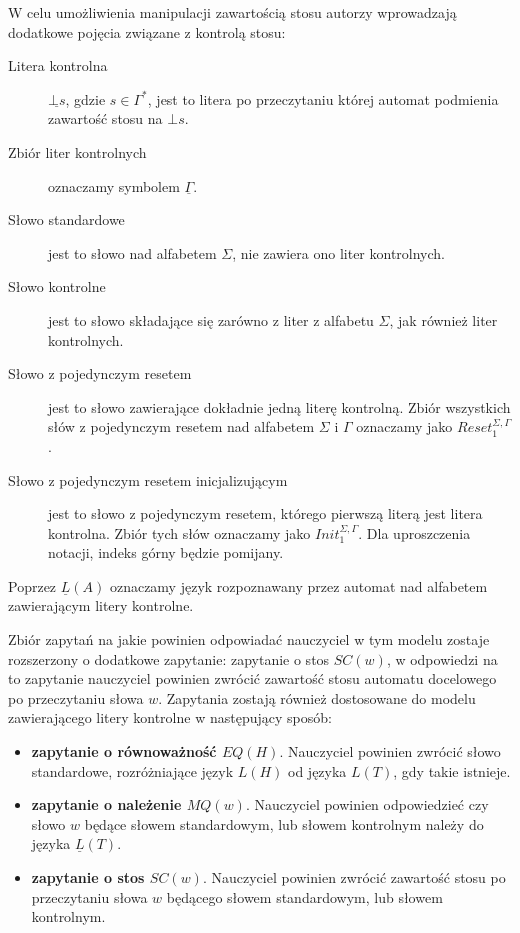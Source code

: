 W celu umożliwienia manipulacji zawartością stosu autorzy wprowadzają dodatkowe pojęcia związane z kontrolą stosu:
\begin{description}
    \item[Litera kontrolna] $\underline{\bot s}$, gdzie $s \in \Gamma^*$, jest to litera po przeczytaniu której automat podmienia
      zawartość stosu na $\bot s$.

    \item[Zbiór liter kontrolnych] oznaczamy symbolem $\underline{\Gamma}$.

    \item[Słowo standardowe] jest to słowo nad alfabetem $\Sigma$, nie zawiera ono liter kontrolnych.

    \item[Słowo kontrolne] jest to słowo składające się zarówno z liter z alfabetu $\Sigma$, jak również liter kontrolnych.

    \item[Słowo z pojedynczym resetem] jest to słowo zawierające dokładnie jedną literę kontrolną. Zbiór wszystkich słów z pojedynczym
      resetem nad alfabetem $\Sigma$ i $\Gamma$ oznaczamy jako $Reset_1^{\Sigma, \Gamma}$.

    \item[Słowo z pojedynczym resetem inicjalizującym] jest to słowo z pojedynczym resetem, którego pierwszą literą jest litera kontrolna.
      Zbiór tych słów oznaczamy jako $Init_1^{\Sigma,\Gamma}$. Dla uproszczenia notacji, indeks górny będzie pomijany.
\end{description}
Poprzez $\underline{L}(A)$ oznaczamy język rozpoznawany przez automat nad alfabetem zawierającym litery kontrolne.

Zbiór zapytań na jakie powinien odpowiadać nauczyciel w tym modelu zostaje rozszerzony o dodatkowe zapytanie: zapytanie o stos $SC(w)$,
w odpowiedzi na to zapytanie nauczyciel powinien zwrócić zawartość stosu automatu docelowego po przeczytaniu słowa $w$.
Zapytania zostają również dostosowane do modelu zawierającego litery kontrolne w następujący sposób:

\begin{itemize}
    \item \textbf{zapytanie o równoważność $EQ(H)$}. Nauczyciel powinien zwrócić słowo standardowe, rozróżniające język $L(H)$ od języka $L(T)$,
    gdy takie istnieje.

    \item \textbf{zapytanie o należenie $MQ(w)$}. Nauczyciel powinien odpowiedzieć czy słowo $w$ będące słowem standardowym,
    lub słowem kontrolnym należy do języka $\underline{L}(T)$.

    \item \textbf{zapytanie o stos $SC(w)$}. Nauczyciel powinien zwrócić zawartość stosu po przeczytaniu słowa $w$ będącego słowem standardowym,
    lub słowem kontrolnym.
\end{itemize}

